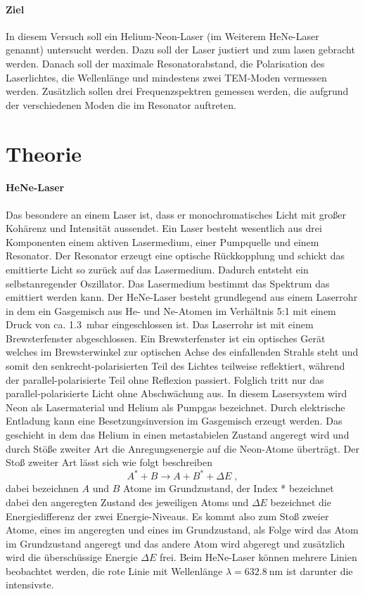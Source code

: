 \paragraph{Ziel} In diesem Versuch soll ein Helium-Neon-Laser (im Weiterem HeNe-Laser genannt) untersucht 
werden. Dazu soll der Laser justiert und zum lasen gebracht werden. Danach soll der maximale Resonatorabstand, 
die Polarisation des Laserlichtes, die Wellenlänge und mindestens zwei TEM-Moden vermessen werden. Zusätzlich 
sollen drei Frequenzspektren gemessen werden, die aufgrund der verschiedenen Moden die im Resonator auftreten. 

\section{Theorie}
\label{sec:Theorie}

\paragraph{HeNe-Laser} 
Das besondere an einem Laser ist, dass er monochromatisches Licht mit großer Kohärenz und Intensität aussendet. 
Ein Laser besteht wesentlich aus drei Komponenten einem aktiven Lasermedium, einer Pumpquelle und einem 
Resonator. Der Resonator erzeugt eine optische Rückkopplung und schickt das emittierte Licht so 
zurück auf das Lasermedium. Dadurch entsteht ein selbstanregender Oszillator. Das Lasermedium bestimmt 
das Spektrum das emittiert werden kann. 
\newline
Der HeNe-Laser besteht grundlegend aus einem Laserrohr in dem ein Gasgemisch aus He- und Ne-Atomen im 
Verhältnis 5:1 mit einem Druck von ca. \SI{1.3}{\milli\bar} eingeschlossen ist. Das Laserrohr 
ist mit einem Brewsterfenster abgeschlossen. Ein Brewsterfenster ist ein optisches Gerät welches 
im Brewsterwinkel zur optischen Achse des einfallenden Strahls steht und somit den senkrecht-polarisierten 
Teil des Lichtes teilweise reflektiert, während der parallel-polarisierte Teil ohne Reflexion passiert. 
Folglich tritt nur das parallel-polarisierte Licht ohne Abschwächung aus. In diesem Lasersystem wird 
Neon als Lasermaterial und Helium als Pumpgas bezeichnet. 
Durch elektrische Entladung kann eine Besetzungsinversion im Gasgemisch erzeugt werden. 
Das geschieht in dem das Helium in einen metastabielen Zustand angeregt wird und durch Stöße zweiter Art 
die Anregungsenergie auf die Neon-Atome überträgt. Der Stoß zweiter Art lässt sich wie folgt beschreiben 
\begin{equation*}
A^* + B \rightarrow A + B^* + \Delta E	\; ,
\end{equation*}
dabei bezeichnen $A$ und $B$ Atome im Grundzustand, der Index * bezeichnet dabei den angeregten Zustand des 
jeweiligen Atoms und $\Delta E$ bezeichnet die Energiedifferenz der zwei Energie-Niveaus. Es kommt also 
zum Stoß zweier Atome, eines im angeregten und eines im Grundzustand, als Folge wird das Atom im Grundzustand 
angeregt und das andere Atom wird abgeregt und zusätzlich wird die überschüssige Energie $\Delta E$ frei.
Beim HeNe-Laser können mehrere Linien beobachtet werden, die rote Linie mit Wellenlänge 
$\lambda = \SI{632.8}{\nano\meter}$ ist darunter die intensivste. 

